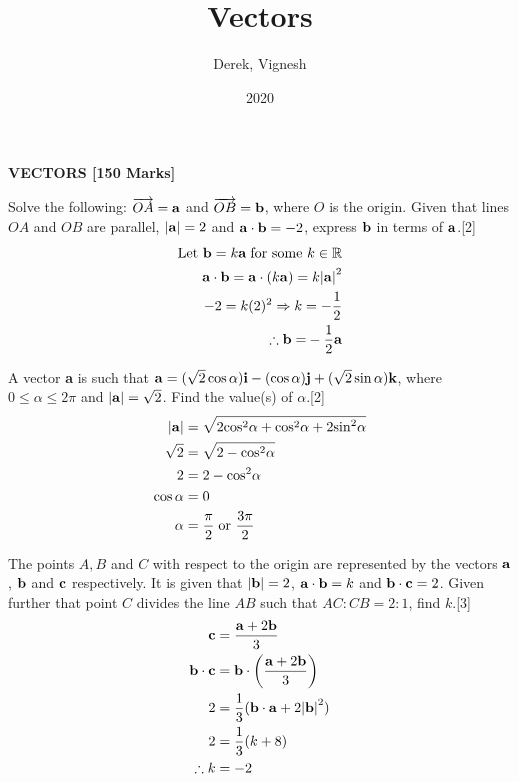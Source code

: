 \documentclass[12pt, a4 paper]{article}
\title{Vectors}
\author{Derek, Vignesh}
\date{2020}
\begin{document}
\maketitle
\textbf{VECTORS [150 Marks]}
\begin{outline}[enumerate]
	\1 Solve the following:
	\2 $\overrightarrow {OA}  = {\bf{a}}$ and $\overrightarrow {OB}  = {\bf{b}}$, where $O$ is the origin. Given that lines $OA$ and $OB$ are parallel, $\left| {\bf{a}} \right| = 2$ and ${\bf{a}} \cdot {\bf{b}} =  - 2$, express $\bf{b}$ in terms of $\bf{a}$.\hfill[2]
	\color{blue}
	\begin{align*}
		\textrm{Let } {\bf{b}} = k{\bf{a}}\;{\textrm{for some }}k \in \mathbb{R}            \\
		{\bf{a}} \cdot {\bf{b}} = {\bf{a}} \cdot (k{\bf{a}}) = k{\left| {\bf{a}} \right|^2} \\
		- 2 = k{(2)^2} \Rightarrow k =  - \frac{1}{2}                                       \\
		\therefore {\bf{b = }} - \frac{1}{2}{\bf{a}}
	\end{align*}

	\color{black}
	\2 A vector \textbf{a} is such that ${\bf{a}} = (\sqrt 2 \cos \alpha ){\bf{i}} - (\cos \alpha ){\bf{j}} + (\sqrt 2 \sin \alpha ){\bf{k}}$, where $0 \le \alpha  \le 2\pi $ and $\left| {\bf{a}} \right| = \sqrt 2 $. Find the value(s) of $\alpha $.\hfill[2]
	\color{blue}
	\begin{align*}
		\left| {\bf{a}} \right| & = \sqrt {2{{\cos }^2}\alpha  + {{\cos }^2}\alpha  + 2{{\sin }^2}\alpha } \\
		\sqrt 2                 & = \sqrt {2 - {{\cos }^2}\alpha }                                         \\
		2                       & = 2 - {\cos ^2}\alpha                                                    \\
		\cos \alpha             & = 0                                                                      \\
		\alpha                  & = \frac{\pi}{2}\;{\textrm{or }}\frac{3\pi}{2}
	\end{align*}

	\color{black}
	\2 The points $A, B$ and $C$ with respect to the origin are represented by the vectors ${\bf{a}}$, ${\bf{b}}$ and ${\bf{c}}$ respectively. It is given that $\left| {\bf{b}} \right| = 2$, ${\bf{a}} \cdot {\bf{b}} = k$ and ${\bf{b}} \cdot {\bf{c}} = 2$. Given further that point $C$ divides the line $AB$ such that $AC:CB = 2:1$, find $k$.\hfill[3]
	\color{blue}
	\begin{align*}
		{\bf{c}}                & = \frac{{{\bf{a}} + 2{\bf{b}}}}{3}                                    \\
		{\bf{b}} \cdot {\bf{c}} & = {\bf{b}} \cdot \left( {\frac{{{\bf{a}} + 2{\bf{b}}}}{3}} \right)    \\
		2                       & = \frac{1}{3}({\bf{b}} \cdot {\bf{a}} + 2{\left| {\bf{b}} \right|^2}) \\
		2                       & = \frac{1}{3}(k + 8)                                                  \\
		\therefore k            & =  - 2
	\end{align*}


\end{outline}
\end{document}
